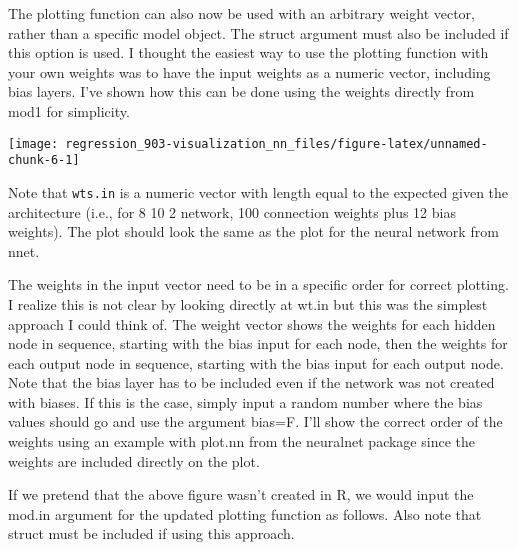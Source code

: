 \documentclass[]{book}
\newenvironment{Shaded}{\begin{snugshade}}{\end{snugshade}}
\newcommand{\DataTypeTok}[1]{\textcolor[rgb]{0.13,0.29,0.53}{#1}}
\newcommand{\KeywordTok}[1]{\textcolor[rgb]{0.13,0.29,0.53}{\textbf{#1}}}
\newcommand{\NormalTok}[1]{#1}
\newcommand{\OperatorTok}[1]{\textcolor[rgb]{0.81,0.36,0.00}{\textbf{#1}}}
\newcommand{\StringTok}[1]{\textcolor[rgb]{0.31,0.60,0.02}{#1}}
\begin{document}
The plotting function can also now be used with an arbitrary weight vector, rather than a specific model object. The struct argument must also be included if this option is used. I thought the easiest way to use the plotting function with your own weights was to have the input weights as a numeric vector, including bias layers. I've shown how this can be done using the weights directly from mod1 for simplicity.

\begin{Shaded}
\end{Shaded}

\begin{center}\texttt{[image: regression\_903-visualization\_nn\_files/figure-latex/unnamed-chunk-6-1]} \end{center}

Note that \texttt{wts.in} is a numeric vector with length equal to the expected given the architecture (i.e., for 8 10 2 network, 100 connection weights plus 12 bias weights). The plot should look the same as the plot for the neural network from nnet.

The weights in the input vector need to be in a specific order for correct plotting. I realize this is not clear by looking directly at wt.in but this was the simplest approach I could think of. The weight vector shows the weights for each hidden node in sequence, starting with the bias input for each node, then the weights for each output node in sequence, starting with the bias input for each output node. Note that the bias layer has to be included even if the network was not created with biases. If this is the case, simply input a random number where the bias values should go and use the argument bias=F. I'll show the correct order of the weights using an example with plot.nn from the neuralnet package since the weights are included directly on the plot.

If we pretend that the above figure wasn't created in R, we would input the mod.in argument for the updated plotting function as follows. Also note that struct must be included if using this approach.
\end{document}
